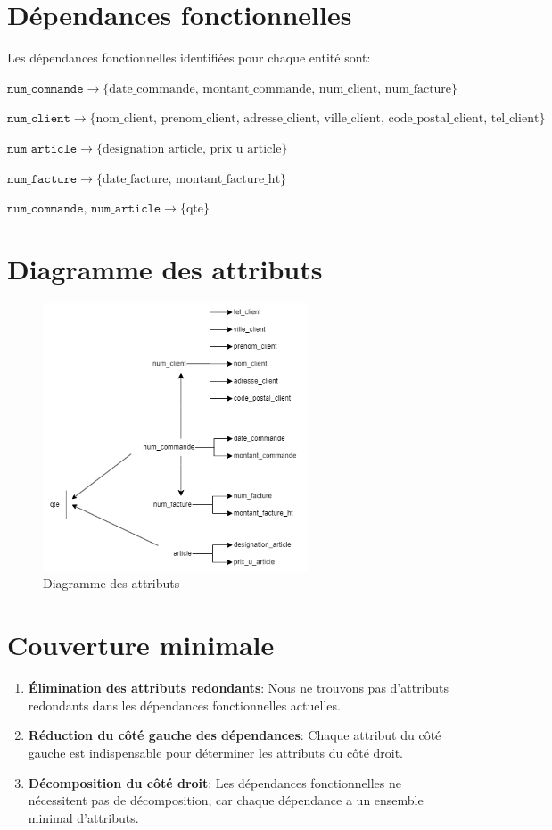 \documentclass[a4paper,11pt]{article}
\begin{document}
\section{Dépendances fonctionnelles}
Les dépendances fonctionnelles identifiées pour chaque entité sont:

$\texttt{num\_commande} \to \{\text{date\_commande, montant\_commande, num\_client, num\_facture}\}$

$\texttt{num\_client} \to \{\text{nom\_client, prenom\_client, adresse\_client, ville\_client, code\_postal\_client, tel\_client}\}$

$\texttt{num\_article} \to \{\text{designation\_article, prix\_u\_article}\}$

$\texttt{num\_facture} \to \{\text{date\_facture, montant\_facture\_ht}\}$

$\texttt{num\_commande, num\_article} \to \{\text{qte}\}$

\section{Diagramme des attributs}
\begin{figure}[H] 
    \centering
    \includegraphics[width=0.7\textwidth]{attributs.png}
    \caption{Diagramme des attributs}
    \label{fig:attributs}
\end{figure}

\break\section{Couverture minimale}

\begin{enumerate}
    \item \textbf{Élimination des attributs redondants}: Nous ne trouvons pas d'attributs redondants dans les dépendances fonctionnelles actuelles.
    \item \textbf{Réduction du côté gauche des dépendances}: Chaque attribut du côté gauche est indispensable pour déterminer les attributs du côté droit.
    \item \textbf{Décomposition du côté droit}: Les dépendances fonctionnelles ne nécessitent pas de décomposition, car chaque dépendance a un ensemble minimal d'attributs.
\end{enumerate}
\end{document}
